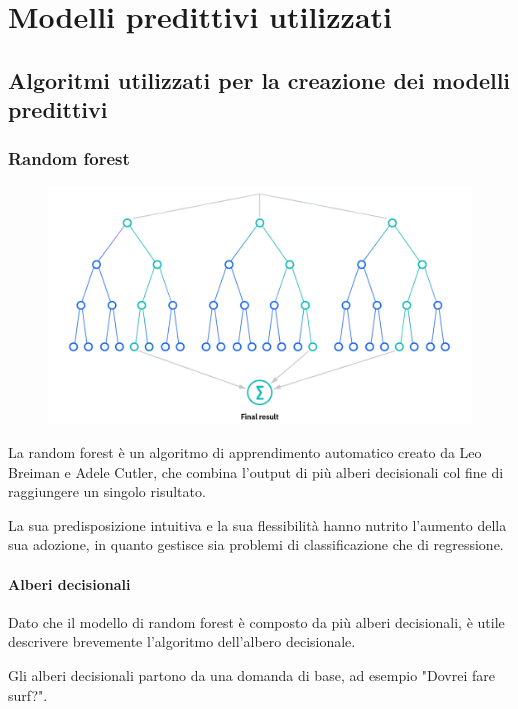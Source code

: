 \chapter{Modelli predittivi utilizzati}
\section{Algoritmi utilizzati per la creazione dei modelli predittivi}
\subsection{Random forest}
\cite{radnomForestIbm}

\begin{figure}
    \begin{center}    
        \includegraphics[width=0.9\linewidth]{images/image10.png}
    \end{center}
\end{figure}

La random forest è un algoritmo di apprendimento automatico creato da Leo Breiman e Adele Cutler, che combina l'output di più alberi decisionali col fine di raggiungere un singolo risultato. 

La sua predisposizione intuitiva e la sua flessibilità hanno nutrito l’aumento della sua adozione, in quanto gestisce sia problemi di classificazione che di regressione.

\subsubsection{Alberi decisionali}
Dato che il modello di random forest è composto da più alberi decisionali, è utile descrivere brevemente l'algoritmo dell'albero decisionale. 

Gli alberi decisionali partono da una domanda di base, ad esempio "Dovrei fare surf?". 

